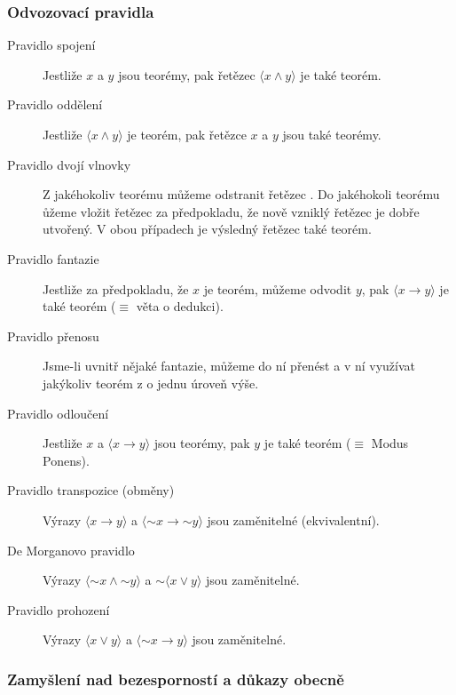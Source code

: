 \documentclass[12pt]{article}
\newcommand{\vnot}[1]{\ensuremath{{\sim}#1}}
\begin{document}
\subsubsection{Odvozovací pravidla}
\begin{description}
    \item[Pravidlo spojení] Jestliže $x$ a $y$ jsou teorémy, pak řetězec
        $\langle x \land y \rangle$ je také teorém.
    
    \item[Pravidlo oddělení] Jestliže $\langle x \land y \rangle$ je teorém,
        pak řetězce $x$ a $y$ jsou také teorémy.

    \item[Pravidlo dvojí vlnovky] Z jakéhokoliv teorému můžeme odstranit
        řetězec \uv{$\sim\sim$}. Do jakéhokoli teorému ůžeme vložit řetězec \uv{$\sim\sim$} za
        předpokladu, že nově vzniklý řetězec je dobře utvořený. V obou případech je
        výsledný řetězec také teorém.

    \item[Pravidlo fantazie] Jestliže za předpokladu, že $x$ je teorém, můžeme odvodit
        $y$, pak $\langle x \rightarrow y \rangle$ je také teorém ($\equiv$ věta o dedukci).

    \item[Pravidlo přenosu] Jsme-li uvnitř nějaké fantazie, můžeme do ní přenést
        a v ní využívat jakýkoliv teorém z  o jednu úroveň výše.

    \item[Pravidlo odloučení] Jestliže $x$ a $\langle x \rightarrow y \rangle$ jsou
        teorémy, pak $y$ je také teorém ($\equiv$ Modus Ponens).

    \item[Pravidlo transpozice (obměny)] Výrazy $\langle x \rightarrow y \rangle$
        a $\langle \vnot{x} \rightarrow \vnot{y} \rangle$ jsou zaměnitelné (ekvivalentní).

    \item[De Morganovo pravidlo] Výrazy $\langle \vnot{x} \land \vnot{y} \rangle$ a
        $\vnot{\langle x \lor y \rangle}$ jsou zaměnitelné.

    \item[Pravidlo prohození] Výrazy $\langle x \lor y \rangle$ a
        $\langle \vnot{x} \rightarrow y \rangle$ jsou zaměnitelné.
\end{description}

\subsubsection{Zamyšlení nad bezesporností a důkazy obecně}
\end{document}
